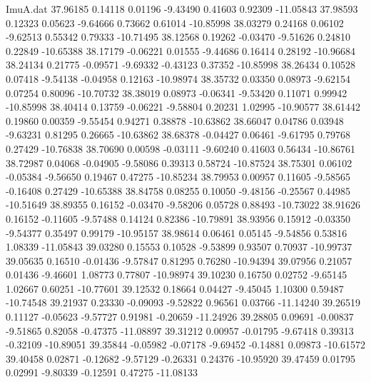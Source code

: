 \begin{filecontents}{ImuA.dat}
  37.96185    0.14118    0.01196   -9.43490    0.41603    0.92309  -11.05843
  37.98593    0.12323    0.05623   -9.64666    0.73662    0.61014  -10.85998
  38.03279    0.24168    0.06102   -9.62513    0.55342    0.79333  -10.71495
  38.12568    0.19262   -0.03470   -9.51626    0.24810    0.22849  -10.65388
  38.17179   -0.06221    0.01555   -9.44686    0.16414    0.28192  -10.96684
  38.24134    0.21775   -0.09571   -9.69332   -0.43123    0.37352  -10.85998
  38.26434    0.10528    0.07418   -9.54138   -0.04958    0.12163  -10.98974
  38.35732    0.03350    0.08973   -9.62154    0.07254    0.80096  -10.70732
  38.38019    0.08973   -0.06341   -9.53420    0.11071    0.99942  -10.85998
  38.40414    0.13759   -0.06221   -9.58804    0.20231    1.02995  -10.90577
  38.61442    0.19860    0.00359   -9.55454    0.94271    0.38878  -10.63862
  38.66047    0.04786    0.03948   -9.63231    0.81295    0.26665  -10.63862
  38.68378   -0.04427    0.06461   -9.61795    0.79768    0.27429  -10.76838
  38.70690    0.00598   -0.03111   -9.60240    0.41603    0.56434  -10.86761
  38.72987    0.04068   -0.04905   -9.58086    0.39313    0.58724  -10.87524
  38.75301    0.06102   -0.05384   -9.56650    0.19467    0.47275  -10.85234
  38.79953    0.00957    0.11605   -9.58565   -0.16408    0.27429  -10.65388
  38.84758    0.08255    0.10050   -9.48156   -0.25567    0.44985  -10.51649
  38.89355    0.16152   -0.03470   -9.58206    0.05728    0.88493  -10.73022
  38.91626    0.16152   -0.11605   -9.57488    0.14124    0.82386  -10.79891
  38.93956    0.15912   -0.03350   -9.54377    0.35497    0.99179  -10.95157
  38.98614    0.06461    0.05145   -9.54856    0.53816    1.08339  -11.05843
  39.03280    0.15553    0.10528   -9.53899    0.93507    0.70937  -10.99737
  39.05635    0.16510   -0.01436   -9.57847    0.81295    0.76280  -10.94394
  39.07956    0.21057    0.01436   -9.46601    1.08773    0.77807  -10.98974
  39.10230    0.16750    0.02752   -9.65145    1.02667    0.60251  -10.77601
  39.12532    0.18664    0.04427   -9.45045    1.10300    0.59487  -10.74548
  39.21937    0.23330   -0.09093   -9.52822    0.96561    0.03766  -11.14240
  39.26519    0.11127   -0.05623   -9.57727    0.91981   -0.20659  -11.24926
  39.28805    0.09691   -0.00837   -9.51865    0.82058   -0.47375  -11.08897
  39.31212    0.00957   -0.01795   -9.67418    0.39313   -0.32109  -10.89051
  39.35844   -0.05982   -0.07178   -9.69452   -0.14881    0.09873  -10.61572
  39.40458    0.02871   -0.12682   -9.57129   -0.26331    0.24376  -10.95920
  39.47459    0.01795    0.02991   -9.80339   -0.12591    0.47275  -11.08133

\end{filecontents}
